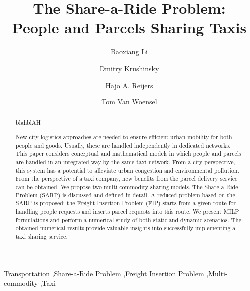 \documentclass[preprint,authoryear,12pt]{elsarticle}
\begin{document}
\nocite{*}
\begin{frontmatter}
\title{The Share-a-Ride Problem:\\People and Parcels Sharing Taxis}
\author[label1]{Baoxiang Li }
\author[label1]{Dmitry Krushinsky}
\author[label2,label3]{Hajo A. Reijers}
\author[label1]{Tom Van Woensel}



\address[label1]{Department of Industrial Engineering and Innovation Sciences, Eindhoven University of Technology, Eindhoven, The Netherlands}
\address[label2]{Department of Mathematics and Computer Science, Eindhoven University of Technology, Eindhoven, The Netherlands}
\address[label3]{Perceptive Software, Apeldoorn, The Netherlands}

\begin{abstract}

blahblAH

New city logistics approaches are needed to ensure efficient urban mobility for both people and goods. Usually, these are handled independently in dedicated networks. This paper considers conceptual and mathematical models in which people and parcels are handled in an integrated way by the same taxi network. From a city perspective, this system has a potential to alleviate urban congestion and environmental pollution. From the perspective of a taxi company, new benefits from the parcel delivery service can be obtained. We propose two multi-commodity sharing models. The Share-a-Ride Problem (SARP) is discussed and defined in detail. A reduced problem based on the SARP is proposed: the Freight Insertion Problem (FIP) starts from a given route for handling people requests and inserts parcel requests into this route. We present MILP formulations and perform a numerical study of both static and dynamic scenarios. The obtained numerical results provide valuable insights into successfully implementing a taxi sharing service.
\end{abstract}

\begin{keyword}
Transportation \sep Share-a-Ride Problem  \sep Freight Insertion Problem \sep Multi-commodity \sep Taxi
\end{keyword}
\end{frontmatter}
\end{document}
